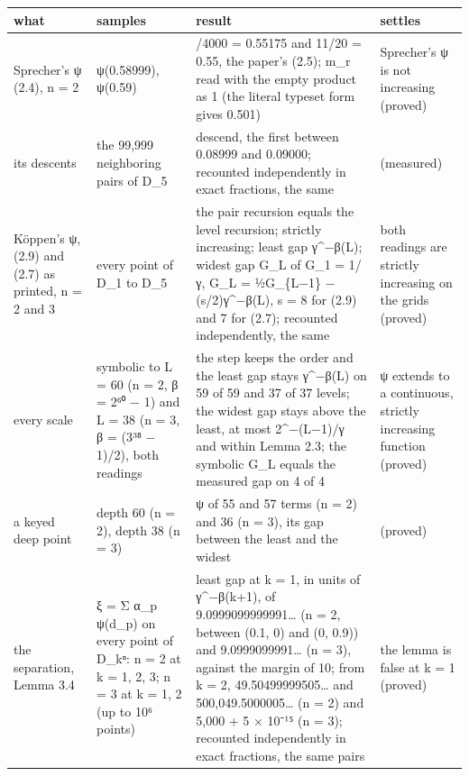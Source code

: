 {\footnotesize
\setlength{\tabcolsep}{6pt}
\begin{longtable}{>{\RaggedRight\arraybackslash}p{}>{\RaggedRight\arraybackslash}p{}>{\RaggedRight\arraybackslash}p{}>{\RaggedRight\arraybackslash}p{}}
\toprule
what & samples & result & settles \\
\midrule
\endhead
Sprecher's ψ (2.4), n = 2 & ψ(0.58999), ψ(0.59) & 2207/4000 = 0.55175 and 11/20 = 0.55, the paper's (2.5); m\_\allowbreak{}r read with the empty product as 1 (the literal typeset form gives 0.501) & Sprecher's ψ is not increasing (proved) \\
its descents & the 99,999 neighboring pairs of D\_\allowbreak{}5 & 10 descend, the first between 0.08999 and 0.09000; recounted independently in exact fractions, the same & (measured) \\
Köppen's ψ, (2.9) and (2.7) as printed, n = 2 and 3 & every point of D\_\allowbreak{}1 to D\_\allowbreak{}5 & the pair recursion equals the level recursion; strictly increasing; least gap γ\textasciicircum{}−β(L); widest gap G\_\allowbreak{}L of G\_\allowbreak{}1 = 1/γ, G\_\allowbreak{}L = ½G\_\allowbreak{}\{L−1\} − (s/2)γ\textasciicircum{}−β(L), s = 8 for (2.9) and 7 for (2.7); recounted independently, the same & both readings are strictly increasing on the grids (proved) \\
every scale & symbolic to L = 60 (n = 2, β = 2⁶⁰ − 1) and L = 38 (n = 3, β = (3³⁸ − 1)/2), both readings & the step keeps the order and the least gap stays γ\textasciicircum{}−β(L) on 59 of 59 and 37 of 37 levels; the widest gap stays above the least, at most 2\textasciicircum{}−(L−1)/γ and within Lemma 2.3; the symbolic G\_\allowbreak{}L equals the measured gap on 4 of 4 & ψ extends to a continuous, strictly increasing function (proved) \\
a keyed deep point & depth 60 (n = 2), depth 38 (n = 3) & ψ of 55 and 57 terms (n = 2) and 36 (n = 3), its gap between the least and the widest & (proved) \\
the separation, Lemma 3.4 & ξ = Σ α\_\allowbreak{}p ψ(d\_\allowbreak{}p) on every point of D\_\allowbreak{}kⁿ: n = 2 at k = 1, 2, 3; n = 3 at k = 1, 2 (up to 10⁶ points) & least gap at k = 1, in units of γ\textasciicircum{}−β(k+1), of 9.0999099999991… (n = 2, between (0.1, 0) and (0, 0.9)) and 9.0999099991… (n = 3), against the margin of 10; from k = 2, 49.50499999505… and 500,049.5000005… (n = 2) and 5,000 + 5 × 10⁻¹⁵ (n = 3); recounted independently in exact fractions, the same pairs & the lemma is false at k = 1 (proved) \\

\end{longtable}}
